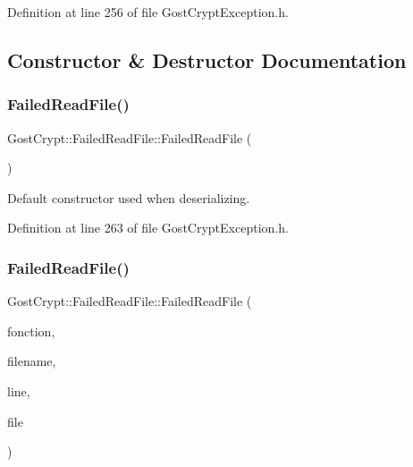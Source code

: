 Definition at line 256 of file Gost\+Crypt\+Exception.\+h.



\subsection{Constructor \& Destructor Documentation}
\mbox{\label{class_gost_crypt_1_1_failed_read_file_abed958466f74017ca79332ea9879c893}} 
\subsubsection{\texorpdfstring{Failed\+Read\+File()}{FailedReadFile()}\hspace{0.1cm}{\footnotesize\ttfamily [1/2]}}
{\footnotesize\ttfamily Gost\+Crypt\+::\+Failed\+Read\+File\+::\+Failed\+Read\+File (\begin{DoxyParamCaption}{ }\end{DoxyParamCaption})\hspace{0.3cm}{\ttfamily [inline]}}



Default constructor used when deserializing. 



Definition at line 263 of file Gost\+Crypt\+Exception.\+h.

\mbox{\label{class_gost_crypt_1_1_failed_read_file_a1b7632eacd92648507d6797e56067886}} 
\subsubsection{\texorpdfstring{Failed\+Read\+File()}{FailedReadFile()}\hspace{0.1cm}{\footnotesize\ttfamily [2/2]}}
{\footnotesize\ttfamily Gost\+Crypt\+::\+Failed\+Read\+File\+::\+Failed\+Read\+File (\begin{DoxyParamCaption}\item[{Q\+String}]{fonction,  }\item[{Q\+String}]{filename,  }\item[{quint32}]{line,  }\item[{Q\+File\+Info}]{file }\end{DoxyParamCaption})\hspace{0.3cm}{\ttfamily [inline]}}



